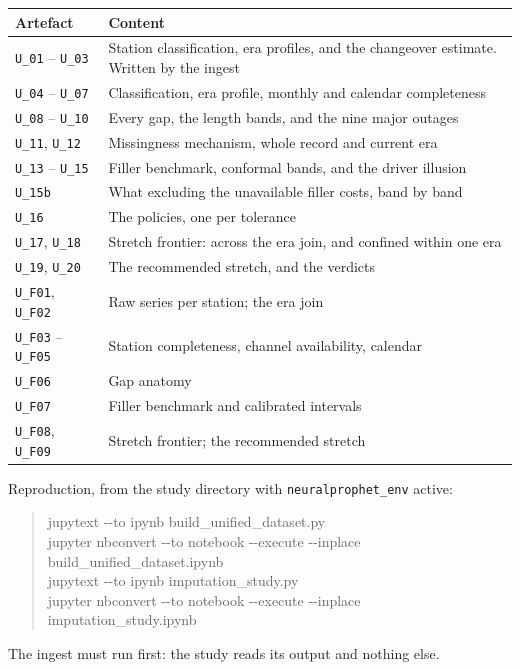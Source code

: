 \documentclass[11pt,a4paper]{article}
\begin{document}
\begin{center}
\small
\begin{tabularx}{\textwidth}{L{3.4cm}Y}
\toprule
\textbf{Artefact} & \textbf{Content} \\
\midrule
\texttt{U\_01} -- \texttt{U\_03} & Station classification, era profiles, and the
changeover estimate. Written by the ingest \\
\texttt{U\_04} -- \texttt{U\_07} & Classification, era profile, monthly and
calendar completeness \\
\texttt{U\_08} -- \texttt{U\_10} & Every gap, the length bands, and the nine
major outages \\
\texttt{U\_11}, \texttt{U\_12} & Missingness mechanism, whole record and current
era \\
\texttt{U\_13} -- \texttt{U\_15} & Filler benchmark, conformal bands, and the
driver illusion \\
\texttt{U\_15b} & What excluding the unavailable filler costs, band by band \\
\texttt{U\_16} & The policies, one per tolerance \\
\texttt{U\_17}, \texttt{U\_18} & Stretch frontier: across the era join, and
confined within one era \\
\texttt{U\_19}, \texttt{U\_20} & The recommended stretch, and the verdicts \\
\addlinespace
\texttt{U\_F01}, \texttt{U\_F02} & Raw series per station; the era join \\
\texttt{U\_F03} -- \texttt{U\_F05} & Station completeness, channel availability,
calendar \\
\texttt{U\_F06} & Gap anatomy \\
\texttt{U\_F07} & Filler benchmark and calibrated intervals \\
\texttt{U\_F08}, \texttt{U\_F09} & Stretch frontier; the recommended stretch \\
\bottomrule
\end{tabularx}
\end{center}

Reproduction, from the study directory with \texttt{neuralprophet\_env} active:

\begin{quote}
\ttfamily\small
jupytext -{}-to ipynb build\_unified\_dataset.py \\
jupyter nbconvert -{}-to notebook -{}-execute -{}-inplace \\
\phantom{jupyter nbconvert }build\_unified\_dataset.ipynb \\[2mm]
jupytext -{}-to ipynb imputation\_study.py \\
jupyter nbconvert -{}-to notebook -{}-execute -{}-inplace \\
\phantom{jupyter nbconvert }imputation\_study.ipynb
\end{quote}

The ingest must run first: the study reads its output and nothing else.
\end{document}

